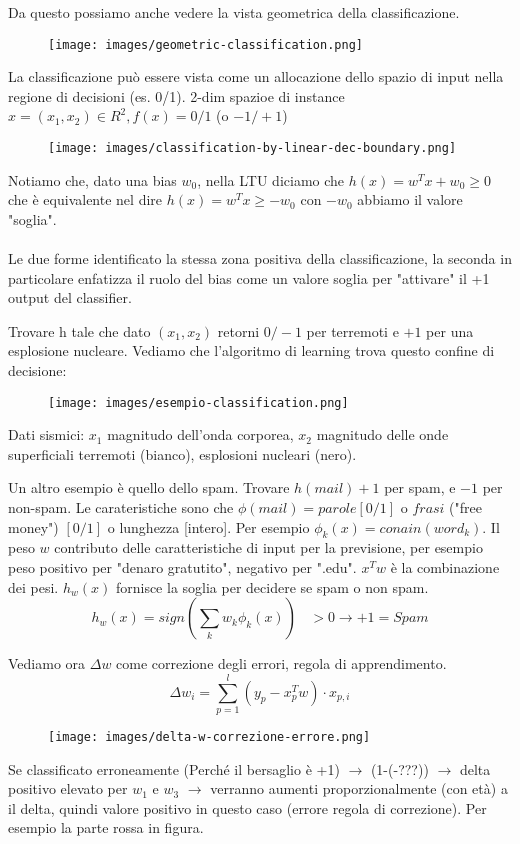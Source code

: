 \hspace{-15pt}Da questo possiamo anche vedere la vista geometrica della classificazione.
\begin{figure}[h!]
    \centering
    \texttt{[image: images/geometric-classification.png]}
\end{figure}
La classificazione può essere vista come un allocazione dello spazio di input nella regione di decisioni (es. 0/1). 2-dim spazioe di instance
$x=(x_1, x_2) \in R^2, f(x) = 0/1$ (o $-1/+1$) 
\begin{figure}[h!]
    \centering
    \texttt{[image: images/classification-by-linear-dec-boundary.png]}
\end{figure}
Notiamo che, dato una bias $w_0$, nella LTU diciamo che $h(x) = w^T x + w_0 \geq 0$ che è equivalente nel dire $h(x) = w^T x \geq -w_0$ con $-w_0$ abbiamo il valore "soglia".\\\\
Le due forme identificato la stessa zona positiva della classificazione, la seconda in particolare enfatizza il ruolo del bias come un valore soglia per "attivare" il +1 output del classifier.
\begin{example}
    Trovare h tale che dato $(x_1, x_2)$ retorni $0/-1$ per terremoti e $+1$ per una esplosione nucleare. Vediamo che l'algoritmo di learning trova questo confine di decisione:
    \begin{figure}[h!]
        \centering
        \texttt{[image: images/esempio-classification.png]}
    \end{figure}
    Dati sismici: $x_1$ magnitudo dell'onda corporea, $x_2$ magnitudo delle onde superficiali terremoti (bianco), esplosioni nucleari (nero).
\end{example}
\begin{example}
    Un altro esempio è quello dello spam. Trovare $h(mail) +1 $ per spam, e $-1$ per non-spam. Le carateristiche sono che $\phi(mail) = parole [0/1]$ o $frasi$ ("free money") $[0/1]$ o lunghezza [intero].
    Per esempio $\phi_k(x) = conain(word_k)$. Il peso $w$ contributo delle caratteristiche di input per la previsione, per esempio peso positivo per "denaro gratutito", negativo per ".edu". $x^Tw$ è la combinazione dei pesi.
    $h_w(x)$ fornisce la soglia per decidere se spam o non spam.
    $$h_w(x) = sign(\sum_{k}w_k \phi_k(x)) \:\:\:\: > 0 \to +1 = Spam$$  
\end{example}
\hspace{-15pt}Vediamo ora $\Delta w $ come correzione degli errori, regola di apprendimento.
$$\Delta w_i = \sum_{p=1}^{l}(y_p - x_p^T w) \cdot x_{p,i}$$
\begin{figure}[h!]
    \centering
    \texttt{[image: images/delta-w-correzione-errore.png]}
\end{figure}
Se classificato erroneamente (Perché il bersaglio è +1) $\to$ (1-(-???)) $\to$ delta positivo elevato per $w_1$ e $w_3$ $\to$ verranno aumenti
proporzionalmente (con età) a il delta, quindi valore positivo in questo caso (errore regola di correzione). Per esempio la parte rossa in figura.

